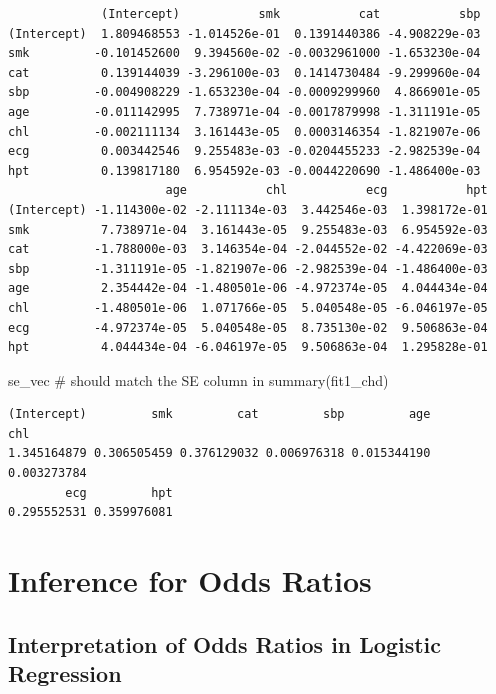 \documentclass[
  letterpaper,
  DIV=11,
  numbers=noendperiod]{scrreprt}
\newenvironment{Shaded}{\begin{snugshade}}{\end{snugshade}}
\newcommand{\CommentTok}[1]{\textcolor[rgb]{0.37,0.37,0.37}{#1}}
\newcommand{\NormalTok}[1]{\textcolor[rgb]{0.00,0.23,0.31}{#1}}
\begin{document}
\begin{verbatim}
             (Intercept)           smk           cat           sbp
(Intercept)  1.809468553 -1.014526e-01  0.1391440386 -4.908229e-03
smk         -0.101452600  9.394560e-02 -0.0032961000 -1.653230e-04
cat          0.139144039 -3.296100e-03  0.1414730484 -9.299960e-04
sbp         -0.004908229 -1.653230e-04 -0.0009299960  4.866901e-05
age         -0.011142995  7.738971e-04 -0.0017879998 -1.311191e-05
chl         -0.002111134  3.161443e-05  0.0003146354 -1.821907e-06
ecg          0.003442546  9.255483e-03 -0.0204455233 -2.982539e-04
hpt          0.139817180  6.954592e-03 -0.0044220690 -1.486400e-03
                      age           chl           ecg           hpt
(Intercept) -1.114300e-02 -2.111134e-03  3.442546e-03  1.398172e-01
smk          7.738971e-04  3.161443e-05  9.255483e-03  6.954592e-03
cat         -1.788000e-03  3.146354e-04 -2.044552e-02 -4.422069e-03
sbp         -1.311191e-05 -1.821907e-06 -2.982539e-04 -1.486400e-03
age          2.354442e-04 -1.480501e-06 -4.972374e-05  4.044434e-04
chl         -1.480501e-06  1.071766e-05  5.040548e-05 -6.046197e-05
ecg         -4.972374e-05  5.040548e-05  8.735130e-02  9.506863e-04
hpt          4.044434e-04 -6.046197e-05  9.506863e-04  1.295828e-01
\end{verbatim}

\begin{Shaded}
\begin{Highlighting}[]
\NormalTok{se\_vec  }\CommentTok{\# should match the SE column in summary(fit1\_chd)}
\end{Highlighting}
\end{Shaded}

\begin{verbatim}
(Intercept)         smk         cat         sbp         age         chl 
1.345164879 0.306505459 0.376129032 0.006976318 0.015344190 0.003273784 
        ecg         hpt 
0.295552531 0.359976081 
\end{verbatim}

\section{Inference for Odds Ratios}\label{inference-for-odds-ratios}

\subsection{Interpretation of Odds Ratios in Logistic
Regression}\label{interpretation-of-odds-ratios-in-logistic-regression}
\end{document}
